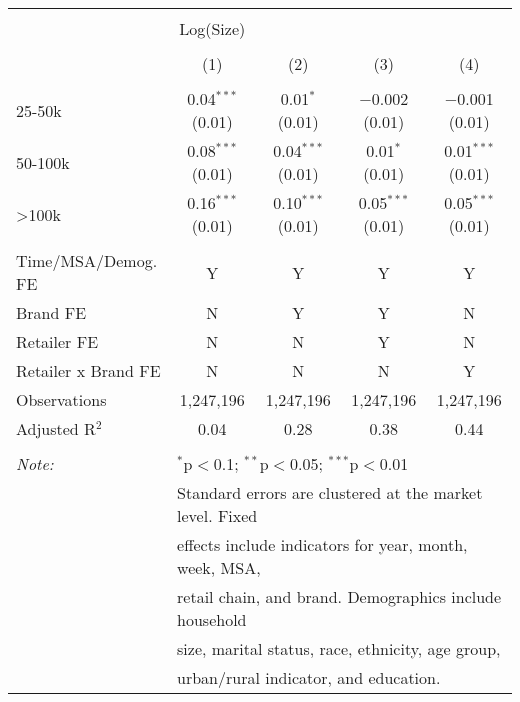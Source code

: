
\begin{table}[!htbp] \centering 
  \caption{} 
  \label{tab:packageSizeFull7265} 
\begin{tabular}{@{\extracolsep{5pt}}lcccc} 
\\[-1.8ex]\hline 
\hline \\[-1.8ex] 
 & Log(Size) &  &  &  \\ 
\\[-1.8ex] & (1) & (2) & (3) & (4)\\ 
\hline \\[-1.8ex] 
 25-50k & 0.04$^{***}$ (0.01) & 0.01$^{*}$ (0.01) & $-$0.002 (0.01) & $-$0.001 (0.01) \\ 
  50-100k & 0.08$^{***}$ (0.01) & 0.04$^{***}$ (0.01) & 0.01$^{*}$ (0.01) & 0.01$^{***}$ (0.01) \\ 
  >100k & 0.16$^{***}$ (0.01) & 0.10$^{***}$ (0.01) & 0.05$^{***}$ (0.01) & 0.05$^{***}$ (0.01) \\ 
 \hline \\[-1.8ex] 
Time/MSA/Demog. FE & Y & Y & Y & Y \\ 
Brand FE & N & Y & Y & N \\ 
Retailer FE & N & N & Y & N \\ 
Retailer x Brand FE & N & N & N & Y \\ 
Observations & 1,247,196 & 1,247,196 & 1,247,196 & 1,247,196 \\ 
Adjusted R$^{2}$ & 0.04 & 0.28 & 0.38 & 0.44 \\ 
\hline 
\hline \\[-1.8ex] 
\textit{Note:}  & \multicolumn{4}{l}{$^{*}$p$<$0.1; $^{**}$p$<$0.05; $^{***}$p$<$0.01} \\ 
 & \multicolumn{4}{l}{Standard errors are clustered at the market level. Fixed } \\ 
 & \multicolumn{4}{l}{effects include indicators for year, month, week, MSA, } \\ 
 & \multicolumn{4}{l}{retail chain, and brand. Demographics include household } \\ 
 & \multicolumn{4}{l}{size, marital status, race, ethnicity, age group, } \\ 
 & \multicolumn{4}{l}{urban/rural indicator, and education.} \\ 
\end{tabular} 
\end{table} 
